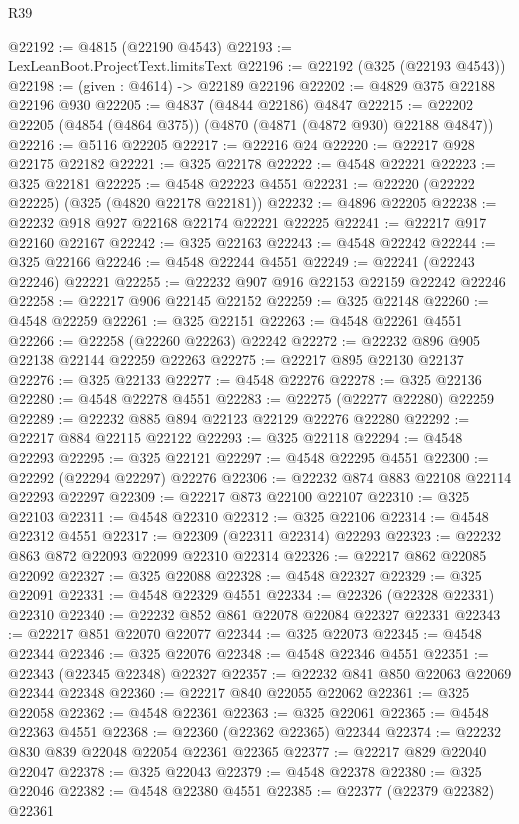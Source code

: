 \begin{lexlean}{R39}
\begin{coremodule}
@22192 := @4815 (@22190 @4543)
@22193 := LexLeanBoot.ProjectText.limitsText
@22196 := @22192 (@325 (@22193 @4543))
@22198 := (given : @4614) -> @22189 @22196
@22202 := @4829 @375 @22188 @22196 @930
@22205 := @4837 (@4844 @22186) @4847
@22215 := @22202 @22205 (@4854 (@4864 @375)) (@4870 (@4871 (@4872 @930) @22188 @4847))
@22216 := @5116 @22205
@22217 := @22216 @24
@22220 := @22217 @928 @22175 @22182
@22221 := @325 @22178
@22222 := @4548 @22221
@22223 := @325 @22181
@22225 := @4548 @22223 @4551
@22231 := @22220 (@22222 @22225) (@325 (@4820 @22178 @22181))
@22232 := @4896 @22205
@22238 := @22232 @918 @927 @22168 @22174 @22221 @22225
@22241 := @22217 @917 @22160 @22167
@22242 := @325 @22163
@22243 := @4548 @22242
@22244 := @325 @22166
@22246 := @4548 @22244 @4551
@22249 := @22241 (@22243 @22246) @22221
@22255 := @22232 @907 @916 @22153 @22159 @22242 @22246
@22258 := @22217 @906 @22145 @22152
@22259 := @325 @22148
@22260 := @4548 @22259
@22261 := @325 @22151
@22263 := @4548 @22261 @4551
@22266 := @22258 (@22260 @22263) @22242
@22272 := @22232 @896 @905 @22138 @22144 @22259 @22263
@22275 := @22217 @895 @22130 @22137
@22276 := @325 @22133
@22277 := @4548 @22276
@22278 := @325 @22136
@22280 := @4548 @22278 @4551
@22283 := @22275 (@22277 @22280) @22259
@22289 := @22232 @885 @894 @22123 @22129 @22276 @22280
@22292 := @22217 @884 @22115 @22122
@22293 := @325 @22118
@22294 := @4548 @22293
@22295 := @325 @22121
@22297 := @4548 @22295 @4551
@22300 := @22292 (@22294 @22297) @22276
@22306 := @22232 @874 @883 @22108 @22114 @22293 @22297
@22309 := @22217 @873 @22100 @22107
@22310 := @325 @22103
@22311 := @4548 @22310
@22312 := @325 @22106
@22314 := @4548 @22312 @4551
@22317 := @22309 (@22311 @22314) @22293
@22323 := @22232 @863 @872 @22093 @22099 @22310 @22314
@22326 := @22217 @862 @22085 @22092
@22327 := @325 @22088
@22328 := @4548 @22327
@22329 := @325 @22091
@22331 := @4548 @22329 @4551
@22334 := @22326 (@22328 @22331) @22310
@22340 := @22232 @852 @861 @22078 @22084 @22327 @22331
@22343 := @22217 @851 @22070 @22077
@22344 := @325 @22073
@22345 := @4548 @22344
@22346 := @325 @22076
@22348 := @4548 @22346 @4551
@22351 := @22343 (@22345 @22348) @22327
@22357 := @22232 @841 @850 @22063 @22069 @22344 @22348
@22360 := @22217 @840 @22055 @22062
@22361 := @325 @22058
@22362 := @4548 @22361
@22363 := @325 @22061
@22365 := @4548 @22363 @4551
@22368 := @22360 (@22362 @22365) @22344
@22374 := @22232 @830 @839 @22048 @22054 @22361 @22365
@22377 := @22217 @829 @22040 @22047
@22378 := @325 @22043
@22379 := @4548 @22378
@22380 := @325 @22046
@22382 := @4548 @22380 @4551
@22385 := @22377 (@22379 @22382) @22361

\end{coremodule}
\end{lexlean}
